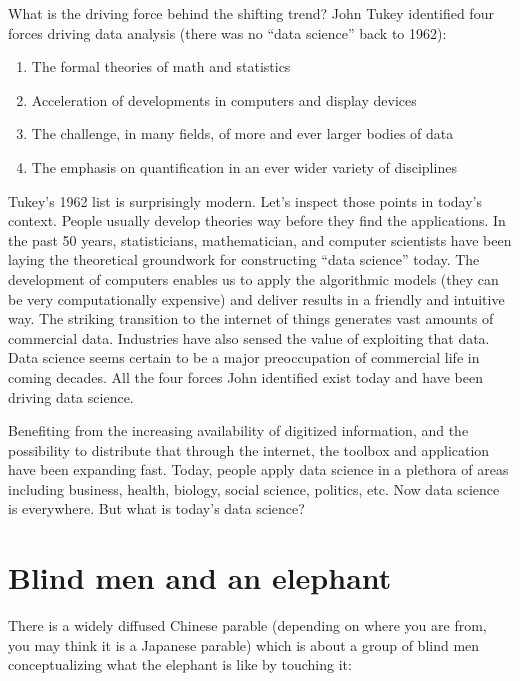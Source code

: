 \documentclass[12pt,]{krantz}
\providecommand{\tightlist}{%
  \setlength{\itemsep}{0pt}\setlength{\parskip}{0pt}}
\begin{document}
What is the driving force behind the shifting trend? John Tukey identified four forces driving data analysis (there was no ``data science'' back to 1962):

\begin{enumerate}
\def\labelenumi{\arabic{enumi}.}
\tightlist
\item
  The formal theories of math and statistics
\item
  Acceleration of developments in computers and display devices
\item
  The challenge, in many fields, of more and ever larger bodies of data
\item
  The emphasis on quantification in an ever wider variety of disciplines
\end{enumerate}

Tukey's 1962 list is surprisingly modern. Let's inspect those points in today's context. People usually develop theories way before they find the applications. In the past 50 years, statisticians, mathematician, and computer scientists have been laying the theoretical groundwork for constructing ``data science'' today. The development of computers enables us to apply the algorithmic models (they can be very computationally expensive) and deliver results in a friendly and intuitive way. The striking transition to the internet of things generates vast amounts of commercial data. Industries have also sensed the value of exploiting that data. Data science seems certain to be a major preoccupation of commercial life in coming decades. All the four forces John identified exist today and have been driving data science.

Benefiting from the increasing availability of digitized information, and the possibility to distribute that through the internet, the toolbox and application have been expanding fast. Today, people apply data science in a plethora of areas including business, health, biology, social science, politics, etc.
Now data science is everywhere. But what is today's data science?

\hypertarget{blind-men-and-an-elephant}{%
\section{Blind men and an elephant}\label{blind-men-and-an-elephant}}

There is a widely diffused Chinese parable (depending on where you are from, you may think it is a Japanese parable) which is about a group of blind men conceptualizing what the elephant is like by touching it:
\end{document}
